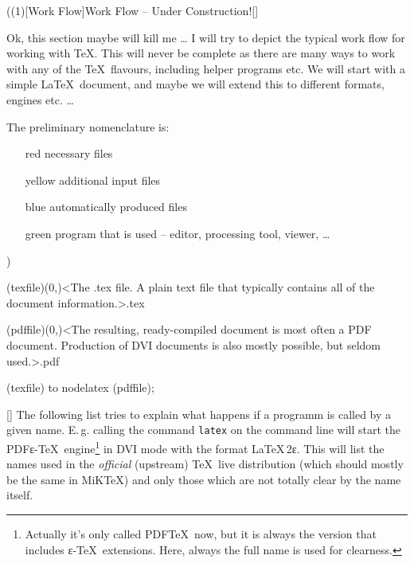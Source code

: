 \tograph(\tostruct(1)[Work Flow]{Work Flow – Under Construction!}[\vip]
{
\flushleft
\large Ok, this section maybe will kill me … I will try to depict the typical work flow for working with \TeX. This will never be complete as there are many ways to work with any of the \TeX\ flavours, including helper programs etc. We will start with a simple \LaTeX\ document, and maybe we will extend this to different formats, engines etc. …

The preliminary nomenclature is:
\begin{itemize}
\item[red] necessary files
\item[yellow] additional input files
\item[blue] automatically produced files
\item[green] program that is used – editor, processing tool, viewer, …
\end{itemize}

\let\necessary\vip
\let\additional\experimental
\let\automatic\normalimportant
\let\program\package
}
){
	\tonode(texfile)(0,\layer)<The .tex file. A plain text file that typically contains all of the document information.>{.tex}
	\steplayer[-5]

	\tonode(pdffile)(0,\layer)<The resulting, ready-compiled document is most often a PDF document. Production of DVI documents is also mostly possible, but seldom used.>{.pdf}

	(texfile) to node{latex} (pdffile);
}

\label{sec:text}

\large
{}

\settextviews  %
\onecolumn

[\normalimportant]
\flushleft  %
The following list tries to explain what happens if a programm is called by a given name. E.\,g. calling the command \texttt{latex} on the command line will start the PDFε-\TeX\ engine\footnote{Actually it's only called PDF\TeX\ now, but it is always the version that includes ε-\TeX\ extensions. Here, always the full name is used for clearness.} in DVI mode with the format \LaTeX\,2\raisebox{-.5ex}ε. This will list the names used in the \emph{official} (upstream) \TeX~live distribution (which should mostly be the same in MiK\TeX) and only those which are not totally clear by the name itself.

